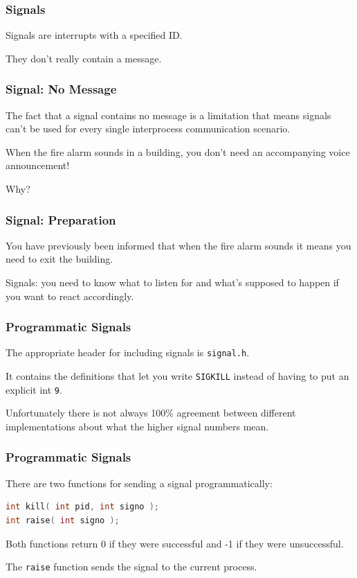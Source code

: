 \begin{frame}
	\frametitle{Signals}

	Signals are interrupts with a specified ID.

	They don't really contain a message.

\end{frame}


\begin{frame}
	\frametitle{Signal: No Message}

	The fact that a signal contains no message is a limitation that means signals can't be used for every single interprocess communication scenario.

	When the fire alarm sounds in a building, you don't need an accompanying voice announcement!

	Why?

\end{frame}



\begin{frame}
	\frametitle{Signal: Preparation}

	You have previously been informed that when the fire alarm sounds it means you need to exit the building.

	Signals: you need to know what to listen for and what's supposed to happen if you want to react accordingly.

\end{frame}


\begin{frame}
	\frametitle{Programmatic Signals}

	The appropriate header for including signals is \texttt{signal.h}.

	It contains the definitions that let you write \texttt{SIGKILL} instead of having to put an explicit int \texttt{9}.

	Unfortunately there is not always 100\% agreement between different implementations about what the higher signal numbers mean.

\end{frame}


\begin{frame}[fragile]
	\frametitle{Programmatic Signals}

	There are two functions for sending a signal programmatically:

	\begin{lstlisting}[language=C]
int kill( int pid, int signo );
int raise( int signo );
\end{lstlisting}

	Both functions return 0 if they were successful and -1 if they were unsuccessful.

	The \texttt{raise} function sends the signal to the current process.

\end{frame}


